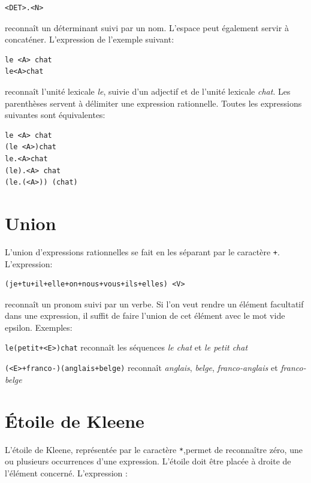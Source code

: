 \begin{verbatim}
<DET>.<N>
\end{verbatim}

\noindent reconnaît un déterminant suivi par un nom. L’espace peut également servir à concaténer.
L’expression de l’exemple suivant:


\begin{verbatim}
le <A> chat
le<A>chat
\end{verbatim}

\noindent reconnaît l’unité lexicale \textit{le}, suivie d’un adjectif et de l’unité lexicale \textit{chat}.
Les parenthèses  servent à délimiter une expression rationnelle.
Toutes les expressions suivantes sont équivalentes:


\begin{verbatim}
le <A> chat
(le <A>)chat
le.<A>chat
(le).<A> chat
(le.(<A>)) (chat)
\end{verbatim}

\section{Union}
\index{\verbc{+}}
L’union d’expressions rationnelles se fait en les séparant par le caractère \verb$+$.
L’expression:

\begin{verbatim}
(je+tu+il+elle+on+nous+vous+ils+elles) <V>
\end{verbatim}

\noindent
reconnaît un pronom suivi par un verbe. Si l’on veut rendre un élément facultatif dans
une expression, il suffit de faire l’union de cet élément avec le mot vide epsilon.
 Exemples:

\bigskip
\noindent \verb$le(petit+<E>)chat$ reconnaît les séquences \textit{le chat}
et \textit{le petit chat}

\smallskip
\noindent \verb$(<E>+franco-)(anglais+belge)$ reconnaît \textit{anglais}, \textit{belge},
\textit{franco-anglais} et \textit{franco-belge}

\section{Étoile de Kleene}
\index{\verbc{*}}
L’étoile de Kleene, représentée par le caractère \verb+*+,permet de reconnaître zéro, une ou
plusieurs occurrences d’une expression. L’étoile doit être placée à droite de l’élément concerné.
L’expression :


